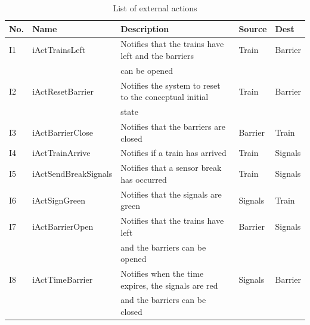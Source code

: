 \documentclass[10pt,a4paper]{article}
\begin{document}
\begin{table}[!hbp]
	\centering
	\begin{adjustwidth}{-2.3cm}{}
	\begin{tabular}{|l|l|l|l|l|}
		
		\hline
		\textbf{No.} & \textbf{Name} & \textbf{Description} & \textbf{Source} & \textbf{Dest} \\
		\hline
        I1& iActTrainsLeft &Notifies that the trains have left and the barriers&Train & Barrier\\
        &&can be opened & & \\ 
        \hline
        I2& iActResetBarrier& Notifies the system to reset to the conceptual initial&Train&Barrier\\
        &&state & &\\
        \hline
        I3& iActBarrierClose& Notifies that the barriers are closed & Barrier &Train\\
        \hline
        I4& iActTrainArrive&Notifies if a train has arrived & Train&Signals\\
        \hline
        I5& iActSendBreakSignals& Notifies that a sensor break has occurred& Train&Signals\\
        \hline
         I6& iActSignGreen& Notifies that the signals are green&Signals&Train\\ 
        \hline
         I7& iActBarrierOpen&Notifies that the trains have left  & Barrier&Signals\\
         &&and the barriers can be opened & &\\
        \hline
         I8& iActTimeBarrier& Notifies when the time expires, the signals are red& Signals&Barrier\\
        && and the barriers can be closed & &\\
        \hline
        
	
	\end{tabular}
	\end{adjustwidth}
	\caption{List of external actions}
\end{table}
\end{document}
